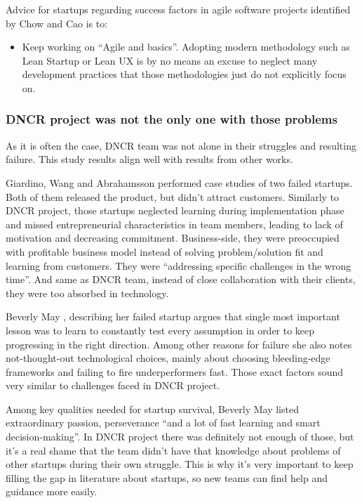 \documentclass{article}
\begin{document}
Advice for startups regarding success factors in agile software projects identified by Chow and Cao is to:
\begin{itemize}
\item Keep working on ``Agile and basics''. Adopting modern methodology such as Lean Startup or Lean UX is by no means an excuse to neglect many development practices that those methodologies just do not explicitly focus on.
\end{itemize}

\subsubsection{DNCR project was not the only one with those problems}
As it is often the case, DNCR team was not alone in their struggles and resulting failure. This study results align well with results from other works.

Giardino, Wang and Abrahamsson \cite{giardino2014early} performed case studies of two failed startups. Both of them released the product, but didn't attract customers. Similarly to DNCR project, those startups neglected learning during implementation phase and missed entrepreneurial characteristics in team members, leading to lack of motivation and decreasing commitment. Business-side, they were preoccupied with profitable business model instead of solving problem/solution fit and learning from customers. They were ``addressing specific challenges in the wrong time''. And same as DNCR team, instead of close collaboration with their clients, they were too absorbed in technology.

Beverly May \cite{may2012applying}, describing her failed startup argues that single most important lesson was to learn to constantly test every assumption in order to keep progressing in the right direction. Among other reasons for failure she also notes not-thought-out technological choices, mainly about choosing bleeding-edge frameworks and failing to fire underperformers fast. Those exact factors sound very similar to challenges faced in DNCR project.

Among key qualities needed for startup survival, Beverly May listed extraordinary passion, perseverance ``and a lot of fast learning and smart decision-making''. In DNCR project there was definitely not enough of those, but it's a real shame that the team didn't have that knowledge about problems of other startups during their own struggle. This is why it's very important to keep filling the gap in literature about startups, so new teams can find help and guidance more easily.
\end{document}
